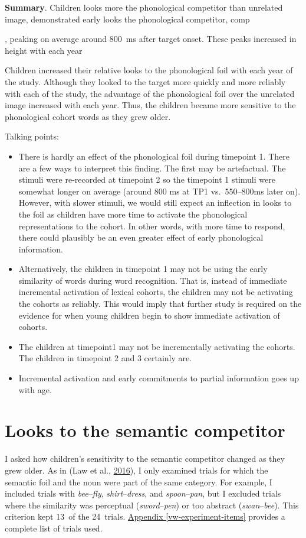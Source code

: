 \documentclass [11pt, proquest] {uwthesis}[2015/03/03]
\providecommand{\tightlist}{%
  \setlength{\itemsep}{0pt}\setlength{\parskip}{0pt}}
\begin{document}
\textbf{Summary}. Children looks more the phonological competitor than
unrelated image, demonstrated early looks the phonological competitor,
comp

, peaking on average around 800~ms after target onset. These peaks
increased in height with each year

Children increased their relative looks to the phonological foil with
each year of the study. Although they looked to the target more quickly
and more reliably with each of the study, the advantage of the
phonological foil over the unrelated image increased with each year.
Thus, the children became more sensitive to the phonological cohort
words as they grew older.

Talking points:
\begin{itemize}
\tightlist
\item
  There is hardly an effect of the phonological foil during timepoint 1.
  There are a few ways to interpret this finding. The first may be
  artefactual. The stimuli were re-recorded at timepoint 2 so the
  timepoint 1 stimuli were somewhat longer on average (around 800 ms at
  TP1 vs.~550--800ms later on). However, with slower stimuli, we would
  still expect an inflection in looks to the foil as children have more
  time to activate the phonological representations to the cohort. In
  other words, with more time to respond, there could plausibly be an
  even greater effect of early phonological information.
\item
  Alternatively, the children in timepoint 1 may not be using the early
  similarity of words during word recognition. That is, instead of
  immediate incremental activation of lexical cohorts, the children may
  not be activating the cohorts as reliably. This would imply that
  further study is required on the evidence for when young children
  begin to show immediate activation of cohorts.
\item
  The children at timepoint1 may not be incrementally activating the
  cohorts. The children in timepoint 2 and 3 certainly are.
\item
  Incremental activation and early commitments to partial information
  goes up with age.
\end{itemize}
\section{Looks to the semantic
competitor}\label{looks-to-the-semantic-competitor}

I asked how children's sensitivity to the semantic competitor changed as
they grew older. As in (Law et al.,
\protect\hyperlink{ref-RWLPaper}{2016}), I only examined trials for
which the semantic foil and the noun were part of the same category. For
example, I included trials with \emph{bee}--\emph{fly},
\emph{shirt}--\emph{dress}, and \emph{spoon}--\emph{pan}, but I excluded
trials where the similarity was perceptual (\emph{sword}--\emph{pen}) or
too abstract (\emph{swan}--\emph{bee}). This criterion kept 13~of the
24~trials. \protect\hyperlink{vw-experiment-items}{Appendix
\ref{vw-experiment-items}} provides a complete list of trials used.
\end{document}
